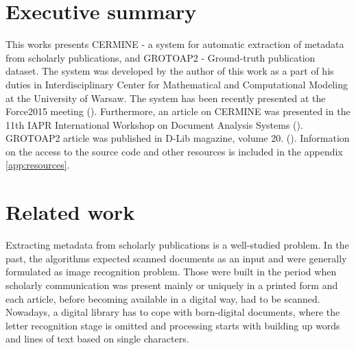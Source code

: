 \section{Executive summary}
This works presents CERMINE - a system for automatic extraction of metadata from scholarly publications, and GROTOAP2 - Ground-truth publication dataset. The system was developed by the author of this work as a part of his duties in Interdisciplinary Center for Mathematical and Computational Modeling at the University of Warsaw. The system has been recently presented at the Force2015 meeting (\cite{Force2015}). Furthermore, an article on CERMINE was presented in the 11th IAPR International Workshop on Document Analysis Systems (\cite{DominikaTkaczykPaweSzostekMateuszFedoryszakPiotrJanDendek2014}). GROTOAP2 article was published in D-Lib magazine, volume 20. (\cite{DominikaTkaczykPaweSzostek2014}).
Information on the access to the source code and other resources is included in the appendix \ref{app:resources}.
\section{Related work}
Extracting metadata from scholarly publications is a well-studied problem. In the past, the algorithms expected scanned documents as an input and were generally formulated as image recognition problem. Those were built in the period when scholarly communication was present mainly or uniquely in a printed form and each article, before becoming available in a digital way, had to be scanned.
Nowadays, a digital library has to cope with born-digital documents, where the letter recognition stage is omitted and processing starts with building up words and lines of text based on single characters.



